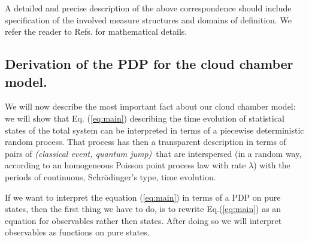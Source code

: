 \documentclass[12pt]{article}
\begin{document}
 A detailed and precise
description of the above correspondence should include specification of the
involved measure structures and domains of definition. We refer the reader
to Refs. \cite{davmha1,davmha2} for mathematical details.
\subsection{Derivation of the PDP for the cloud chamber model.}
We will now describe the most important fact about our cloud chamber
model: we will show that Eq. (\ref{eq:main}) describing the time
evolution of statistical states of the total system can be interpreted
in terms of a piecewise deterministic random process. That process has
then a transparent description in terms of pairs of
{\sl (classical event, quantum jump)}\, that are interspersed (in a random
way, according to an homogeneous Poisson point process law with rate
$\lambda$) with the periods of continuous, Schr\"odinger's type, time
evolution.

If we want to interpret the equation (\ref{eq:main}) in terms of a PDP on
pure states, then the first thing we have to do, is to rewrite
Eq.(\ref{eq:main}) as an equation for observables rather then states. After
doing so we will interpret observables as functions on pure states. 
\end{document}
